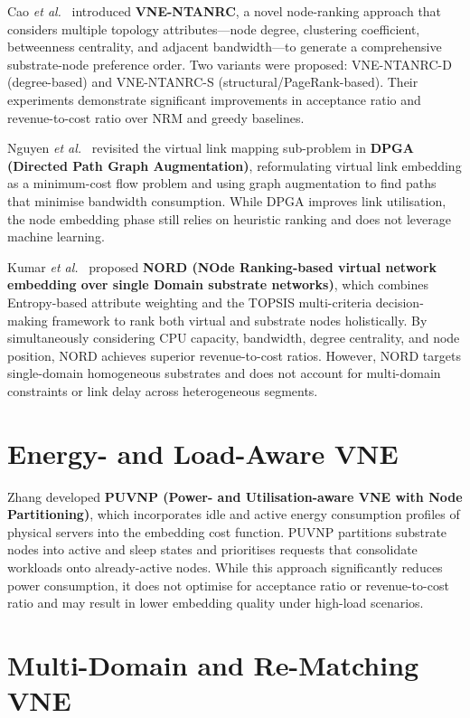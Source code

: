 \documentclass[12pt,a4paper]{report}
\begin{document}
Cao \textit{et al.}\ \cite{cao2018ntanrc} introduced \textbf{VNE-NTANRC}, a novel node-ranking
approach that considers multiple topology attributes---node degree, clustering coefficient,
betweenness centrality, and adjacent bandwidth---to generate a comprehensive substrate-node
preference order. Two variants were proposed: VNE-NTANRC-D (degree-based) and VNE-NTANRC-S
(structural/PageRank-based). Their experiments demonstrate significant improvements in
acceptance ratio and revenue-to-cost ratio over NRM and greedy baselines.

Nguyen \textit{et al.}\ \cite{nguyen2020rethinking} revisited the virtual link mapping
sub-problem in \textbf{DPGA (Directed Path Graph Augmentation)}, reformulating virtual link
embedding as a minimum-cost flow problem and using graph augmentation to find paths that
minimise bandwidth consumption. While DPGA improves link utilisation, the node embedding phase
still relies on heuristic ranking and does not leverage machine learning.

Kumar \textit{et al.}\ \cite{kumar2023nord} proposed \textbf{NORD (NOde Ranking-based virtual
network embedding over single Domain substrate networks)}, which combines Entropy-based
attribute weighting and the TOPSIS multi-criteria decision-making framework to rank both virtual
and substrate nodes holistically. By simultaneously considering CPU capacity, bandwidth, degree
centrality, and node position, NORD achieves superior revenue-to-cost ratios. However, NORD
targets single-domain homogeneous substrates and does not account for multi-domain constraints
or link delay across heterogeneous segments.

\section{Energy- and Load-Aware VNE}

Zhang \cite{zhang2018puvnp} developed \textbf{PUVNP (Power- and Utilisation-aware VNE with
Node Partitioning)}, which incorporates idle and active energy consumption profiles of physical
servers into the embedding cost function. PUVNP partitions substrate nodes into active and
sleep states and prioritises requests that consolidate workloads onto already-active nodes.
While this approach significantly reduces power consumption, it does not optimise for
acceptance ratio or revenue-to-cost ratio and may result in lower embedding quality under
high-load scenarios.

\section{Multi-Domain and Re-Matching VNE}
\end{document}
